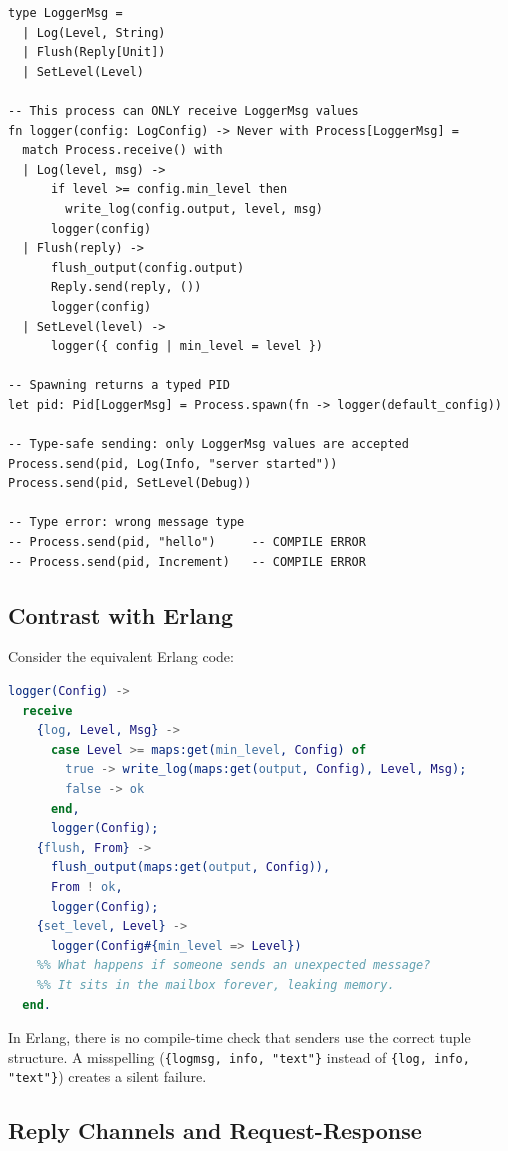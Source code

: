 \documentclass[11pt,a4paper]{article}
\begin{document}
\begin{lstlisting}[language=japl,caption={Typed mailbox definition and use}]
type LoggerMsg =
  | Log(Level, String)
  | Flush(Reply[Unit])
  | SetLevel(Level)

-- This process can ONLY receive LoggerMsg values
fn logger(config: LogConfig) -> Never with Process[LoggerMsg] =
  match Process.receive() with
  | Log(level, msg) ->
      if level >= config.min_level then
        write_log(config.output, level, msg)
      logger(config)
  | Flush(reply) ->
      flush_output(config.output)
      Reply.send(reply, ())
      logger(config)
  | SetLevel(level) ->
      logger({ config | min_level = level })

-- Spawning returns a typed PID
let pid: Pid[LoggerMsg] = Process.spawn(fn -> logger(default_config))

-- Type-safe sending: only LoggerMsg values are accepted
Process.send(pid, Log(Info, "server started"))
Process.send(pid, SetLevel(Debug))

-- Type error: wrong message type
-- Process.send(pid, "hello")     -- COMPILE ERROR
-- Process.send(pid, Increment)   -- COMPILE ERROR
\end{lstlisting}

\subsection{Contrast with Erlang}

Consider the equivalent Erlang code:

\begin{lstlisting}[language=erlang,caption={Erlang: untyped messages}]
logger(Config) ->
  receive
    {log, Level, Msg} ->
      case Level >= maps:get(min_level, Config) of
        true -> write_log(maps:get(output, Config), Level, Msg);
        false -> ok
      end,
      logger(Config);
    {flush, From} ->
      flush_output(maps:get(output, Config)),
      From ! ok,
      logger(Config);
    {set_level, Level} ->
      logger(Config#{min_level => Level})
    %% What happens if someone sends an unexpected message?
    %% It sits in the mailbox forever, leaking memory.
  end.
\end{lstlisting}

In Erlang, there is no compile-time check that senders use the correct tuple structure. A misspelling (\texttt{\{logmsg, info, "text"\}} instead of \texttt{\{log, info, "text"\}}) creates a silent failure.

\subsection{Reply Channels and Request-Response}
\end{document}
